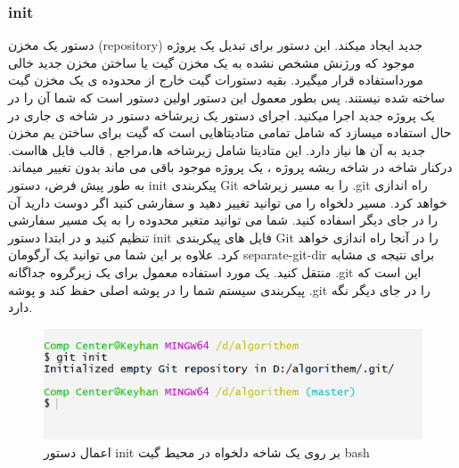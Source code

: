 \subsubsection{init}
دستور  یک مخزن (repository) جدید ایجاد میکند. این دستور برای تبدیل یک پروژه موجود که ورژنش مشخص نشده به یک مخزن گیت یا ساختن   مخزن جدید خالی مورداستفاده قرار میگیرد. \newline
بقیه دستورات گیت خارج از محدوده ی یک مخزن گیت ساخته شده نیستند. پس بطور معمول این دستور اولین دستور است که شما آن را در یک پروژه جدید اجرا میکنید. \newline
اجرای دستور  یک زیرشاخه دستور  در شاخه ی جاری در حال استفاده میسازد که شامل تمامی متادیتاهایی است که گیت برای ساختن یم مخزن جدید به آن ها نیاز دارد. این متادیتا شامل زیرشاخه ها،مراجع , قالب فایل هااست. \newline
درکنار شاخه  در شاخه ریشه پروژه ، یک پروژه موجود باقی می ماند بدون تغییر میماند.  \newline
به طور پیش فرض، دستور init پیکربندی Git را به مسیر زیرشاخه .git راه اندازی خواهد کرد. مسیر دلخواه را می توانید تغییر دهید و سفارشی کنید اگر دوست دارید آن را در جای دیگر اسفاده کنید. شما می توانید متغیر محدوده   را به یک مسیر سفارشی تنظیم کنید و در ابتدا دستور init فایل های پیکربندی Git را در آنجا راه اندازی خواهد کرد. علاوه بر این شما می توانید یک آرگومان separate-git-dir برای نتیجه ی مشابه منتقل کنید. یک مورد استفاده معمول برای یک زیرگروه جداگانه .git این است که پیکربندی سیستم شما را در پوشه اصلی حفظ کند و پوشه .git را در جای دیگر نگه دارد.
\newline
\begin{figure}[tbh]
	\centering
	\includegraphics[width=1\textwidth]{./Figures/GitInit}
	\caption{ اعمال دستور init بر روی یک شاخه دلخواه در محیط گیت bash }
	\label{Fig:GitInit}
\end{figure}

\newpage
